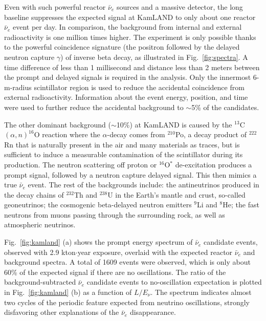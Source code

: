 \documentclass[aps,twocolumn,preprintnumbers,amsmath,superscriptaddress,amssymb,floats,nofootinbib]{revtex4-1}
\begin{document}
Even with such powerful reactor $\bar\nu_e$ sources and a massive detector, the long baseline suppresses the expected signal at KamLAND to only about one reactor $\bar\nu_e$ event per day. 
In comparison, the background from internal and external radioactivity is one million times higher. 
The experiment is only possible thanks to the powerful coincidence signature (the positron followed by the delayed neutron capture $\gamma$) of inverse beta decay, as illustrated in Fig.~\ref{fig:spectra}. 
A time difference of less than 1 millisecond and distance less than 2 meters between the prompt and delayed signals is required in the analysis. 
Only the innermost 6-m-radius scintillator region is used to reduce the accidental coincidence from external radioactivity. 
Information about the event energy, position, and time were used to further reduce the accidental background to $\sim$5\% of the candidates.

The other dominant background ($\sim$10\%) at KamLAND is caused by the $^{13}$C$(\alpha,n)^{16}$O reaction where the $\alpha$-decay comes from $^{210}$Po, 
a decay product of $^{222}$Rn that is naturally present in the air and many materials as traces, but is sufficient to induce a measurable contamination of the scintillator during its production.
The neutron scattering off proton or $^{16}$O$^*$ de-excitation produces a prompt signal, followed by a neutron capture delayed signal. This then mimics a true $\bar\nu_e$ event. The rest of the backgrounds include: the antineutrinos produced in the decay chains of $^{232}$Th and $^{238}$U in the Earth's mantle and crust, so-called geoneutrinos; the cosmogenic beta-delayed neutron emitters $^{9}$Li and $^{8}$He;  the fast neutrons from muons passing through the surrounding rock, as well as atmospheric neutrinos. 

Fig.~\ref{fig:kamland} (a) shows the prompt energy spectrum of $\bar\nu_e$ candidate
events, observed with 2.9 kton$\cdot$year exposure, overlaid with the expected reactor $\bar\nu_{e}$ and background spectra. A total of 1609 events were observed, which is only about 60\% of the expected signal if there are no oscillations. The ratio of the background-subtracted $\bar\nu_e$ candidate events to no-oscillation expectation is plotted in Fig.~\ref{fig:kamland} (b) as a function of $L/E_{\nu}$. The spectrum indicates almost two cycles of the periodic feature expected from neutrino oscillations, strongly disfavoring other explanations of the $\bar\nu_e$ disappearance.
\end{document}
